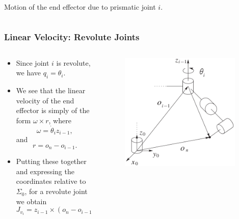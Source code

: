 \begin{frame}
\begin{columns}
\begin{column}{0.4\textwidth}
\begin{figure}[bth]
            \end{figure}
            \vspace{-3mm}
            \centering
            \footnotesize{Motion of the end effector due to prismatic joint $i$.}
        \end{column}
    \end{columns}
\end{frame}



\begin{frame}
    \frametitle{Linear Velocity: Revolute Joints}

    \begin{columns}
        \begin{column}{0.6\textwidth}
            \begin{itemize}
                \item Since joint $i$ is revolute, we have $q_i = \theta_i$.
                \item We see that the linear velocity of the end effector is
                simply of the form $\omega \times r$, where \[ \omega =
                \dot{\theta}_i z_{i-1}, \] and \[ r = o_n - o_{i-1}. \]
                \item Putting these together and expressing the coordinates
                relative to $\Sigma_0$, for a revolute joint we obtain
                \[ J_{v_i} = z_{i-1} \times (o_n - o_{i-1}). \]
            \end{itemize}
        \end{column}
        \begin{column}{0.4\textwidth}
            \begin{figure}[bth]
                \centering
                \includegraphics[width=0.95\textwidth]{figures/motion_due_to_revolute.png} 

\end{figure}
\end{column}
\end{columns}
\end{frame}
